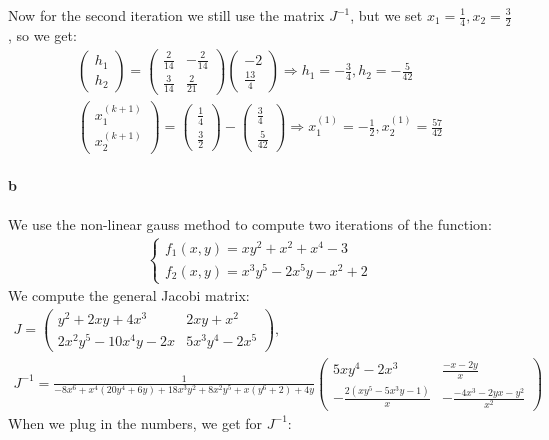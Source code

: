 Now for the second iteration we still use the matrix $J^{-1}$, but we set $x_1 = \frac{1}{4}, x_2 = \frac{3}{2}$, so we get:
\begin{gather*}
\left( \begin{array}{c}
h_1\\
h_2
\end{array} \right) = 
\left( \begin{array}{cc}
\frac{2}{14} & -\frac{2}{14}\\
\frac{3}{14} & \frac{2}{21}
\end{array} \right)
\left( \begin{array}{c}
-2 \\ 
\frac{13}{4}
\end{array} \right) \Rightarrow h_1 = -\frac{3}{4}, h_2 = -\frac{5}{42}\\
\left( \begin{array}{c}
x_1^{(k+1)}\\
x_2^{(k+1)}
\end{array} \right) = 
\left( \begin{array}{c}
\frac{1}{4}\\
\frac{3}{2}
\end{array} \right) -
\left( \begin{array}{c}
\frac{3}{4} \\
\frac{5}{42}
\end{array} \right) \Rightarrow x_1^{(1)} = -\frac{1}{2}, x_2^{(1)} = \frac{57}{42}
\end{gather*}

\paragraph{b}

We use the non-linear gauss method to compute two iterations of the function:
\begin{gather*}
\begin{cases}
f_1 (x,y) = xy^2 + x^2 + x^4 -3 \\
f_2 (x,y) = x^3 y^5-2x^5y -x^2 +2 
\end{cases}
\end{gather*}
We compute the general Jacobi matrix:
\begin{gather*}
J = \left( \begin{array}{cc}
y^2 + 2xy + 4x^3 & 2xy + x^2 \\
2x^2y^5-10x^4y-2x & 5x^3 y^4 - 2x^5
\end{array} \right),\\
J^{-1} = \frac{1}{-8x^6 +x^4(20y^4 + 6y)+18x^3y^2 + 8x^2y^5 +x(y^6+2) + 4y}
\left( \begin{array}{cc}
5xy^4-2x^3 & \frac{-x-2y}{x}\\
-\frac{2(xy^5 - 5x^3y-1)}{x}& -\frac{-4x^3-2yx-y^2}{x^2}
\end{array} \right)
\end{gather*}
When we plug in the numbers, we get for $J^{-1}$:

